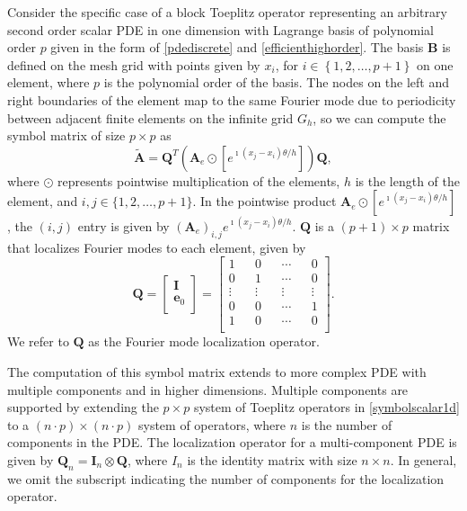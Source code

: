\documentclass[review]{siamart190516}
\begin{document}
Consider the specific case of a block Toeplitz operator representing an arbitrary second order scalar PDE in one dimension with Lagrange basis of polynomial order $p$ given in the form of \cref{pdediscrete} and \cref{efficienthighorder}.
The basis $\mathbf{B}$ is defined on the mesh grid with points given by $x_i$, for $i \in \left\lbrace 1, 2, \dots, p + 1 \right\rbrace$ on one element, where $p$ is the polynomial order of the basis.
The nodes on the left and right boundaries of the element map to the same Fourier mode due to periodicity between adjacent finite elements on the infinite grid $G_h$, so we can compute the symbol matrix of size $p \times p$ as
\begin{equation}\label{symbolscalar1d}
\tilde{\mathbf{A}} = \mathbf{Q}^T \left( \mathbf{A}_e \odot \left[ e^{\imath \left( x_j - x_i \right) \theta / h} \right] \right) \mathbf{Q},
\end{equation}
where $\odot$ represents pointwise multiplication of the elements, $h$ is the length of the element, and $i, j \in \lbrace 1, 2, \dots, p + 1 \rbrace$.
In the pointwise product $\mathbf{A}_e \odot \left[ e^{\imath \left( x_j - x_i \right) \theta / h} \right]$, the $\left( i, j \right)$ entry is given by $\left( \mathbf{A}_e \right)_{i, j} e^{\imath \left( x_j - x_i \right) \theta / h}$.
$\mathbf{Q}$ is a $\left( p + 1 \right) \times p$ matrix that localizes Fourier modes to each element, given by
\begin{equation}
\mathbf{Q} =
\begin{bmatrix}
    \mathbf{I}   \\
    \mathbf{e}_0 \\
\end{bmatrix} =
\begin{bmatrix}
    1      && 0      && \cdots && 0      \\
    0      && 1      && \cdots && 0      \\
    \vdots && \vdots && \vdots && \vdots \\
    0      && 0      && \cdots && 1      \\
    1      && 0      && \cdots && 0      \\
\end{bmatrix}.
\end{equation}
We refer to $\mathbf{Q}$ as the Fourier mode localization operator.

The computation of this symbol matrix extends to more complex PDE with multiple components and in higher dimensions.
Multiple components are supported by extending the $p \times p$ system of Toeplitz operators in \cref{symbolscalar1d} to a $\left( n \cdot p \right) \times \left( n \cdot p \right)$ system of operators, where $n$ is the number of components in the PDE.
The localization operator for a multi-component PDE is given by $\mathbf{Q}_n = \mathbf{I}_n \otimes \mathbf{Q}$, where $I_n$ is the identity matrix with size $n \times n$.
In general, we omit the subscript indicating the number of components for the localization operator.
\end{document}

